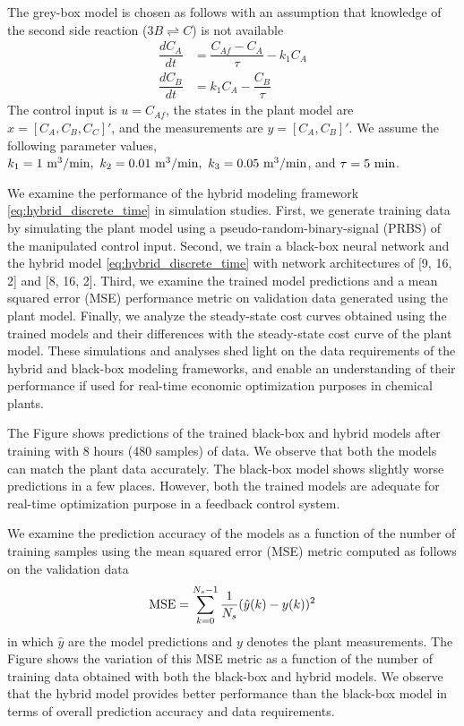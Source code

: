 \documentclass{article}
\begin{document}
The grey-box model is chosen as follows with an assumption that knowledge of the
second side reaction ($3B \rightleftharpoons C $) is not available
\begin{align*}
  \dfrac{dC_A}{dt} &= \dfrac{C_{Af} - C_A}{\tau} - k_1C_A\\
  \dfrac{dC_B}{dt} &= k_1C_A - \dfrac{C_B}{\tau}
\end{align*}
The control input is $u = C_{Af}$, the states in the plant model are $x = [C_A,
C_B, C_C]'$, and the measurements are $y = [C_A, C_B]'$. We assume the following
parameter values, $k_1 = 1 \ \textnormal{m}^3/\textnormal{min}, \ k_2 = 0.01 \
\textnormal{m}^3/\textnormal{min}, \ k_3 = 0.05 \
\textnormal{m}^3/\textnormal{min}$, and $\tau = 5 \ \textnormal{min}$.

We examine the performance of the hybrid modeling framework
\eqref{eq:hybrid_discrete_time} in simulation studies. First, we generate
training data by simulating the plant model using a pseudo-random-binary-signal
(PRBS) of the manipulated control input. Second, we train a black-box neural network
and the hybrid model \eqref{eq:hybrid_discrete_time} with network architectures
of [9, 16, 2] and [8, 16, 2]. Third, we examine the trained model predictions
and a mean squared error (MSE) performance metric on validation data generated
using the plant model. Finally, we analyze the steady-state cost curves obtained
using the trained models and their differences with the steady-state cost curve
of the plant model. These simulations and analyses shed light on the data
requirements of the hybrid and black-box modeling frameworks, and enable an
understanding of their performance if used for real-time economic optimization
purposes in chemical plants.

The Figure shows predictions of the trained black-box
and hybrid models after training with 8 hours (480 samples) of data. We observe
that both the models can match the plant data accurately. The black-box model
shows slightly worse predictions in a few places. However, both the trained
models are adequate for real-time optimization purpose in a feedback control system.


We examine the prediction accuracy of the models as a function of the number of
training samples using the mean squared error (MSE) metric computed as follows
on the validation data
\begin{align*}
  \textnormal{MSE} =  \sum_{k=0}^{N_s-1} 
  \dfrac{1}{N_s}(\hat{y}(k) - y(k))^2
\end{align*}
in which $\hat{y}$ are the model predictions and $y$ denotes the plant
measurements. The Figure  shows the variation of this
MSE metric as a function of the number of training data obtained with both the
black-box and hybrid models. We observe that the hybrid model provides better
performance than the black-box model in terms of overall prediction accuracy and
data requirements.
\end{document}
